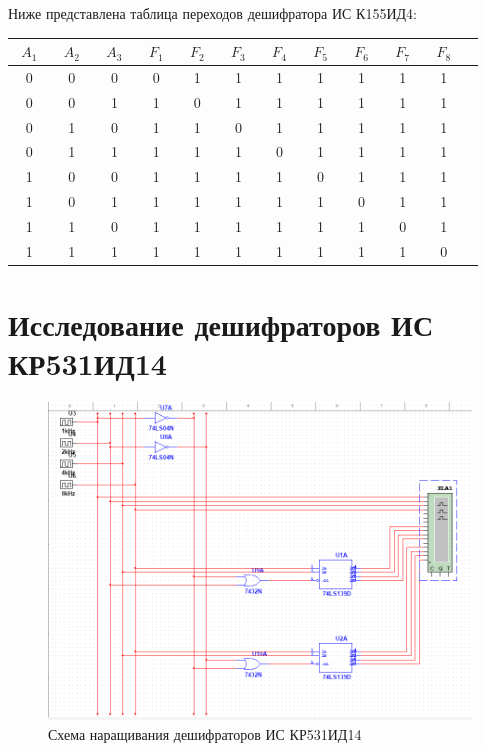 Ниже представлена таблица переходов дешифратора ИС К155ИД4:

\begin{table}[ht]
	\centering
	\begin{tabular}{|c|c|c|c|c|c|c|c|c|c|c|c|}
		\hline
		$~~A_1~~$ & $~~A_2~~$ & $~~A_3~~$ & $~~F_1~~$ & $~~F_2~~$ & $~~F_3~~$ & $~~F_4~~$ & $~~F_5~~$ & $~~F_6~~$ & $~~F_7~~$ & $~~F_8~~$ \\
		\hline
		0 & 0 & 0 & 0 & 1 & 1 & 1 & 1 & 1 & 1 & 1 \\
		\hline
		0 & 0 & 1 & 1 & 0 & 1 & 1 & 1 & 1 & 1 & 1 \\
		\hline
		0 & 1 & 0 & 1 & 1 & 0 & 1 & 1 & 1 & 1 & 1 \\
		\hline
		0 & 1 & 1 & 1 & 1 & 1 & 0 & 1 & 1 & 1 & 1 \\
		\hline
		1 & 0 & 0 & 1 & 1 & 1 & 1 & 0 & 1 & 1 & 1 \\
		\hline
		1 & 0 & 1 & 1 & 1 & 1 & 1 & 1 & 0 & 1 & 1 \\
		\hline
		1 & 1 & 0 & 1 & 1 & 1 & 1 & 1 & 1 & 0 & 1 \\
		\hline
		1 & 1 & 1 & 1 & 1 & 1 & 1 & 1 & 1 & 1 & 0 \\
		\hline
	\end{tabular}
\end{table}


\chapter{Исследование дешифраторов ИС КР531ИД14}

\begin{figure}[ht]
	\centering
	\includegraphics[width=1\linewidth]{img/DC3-8}
	\caption{Схема наращивания дешифраторов ИС КР531ИД14}
	\label{fig:dc3-8}
\end{figure}


